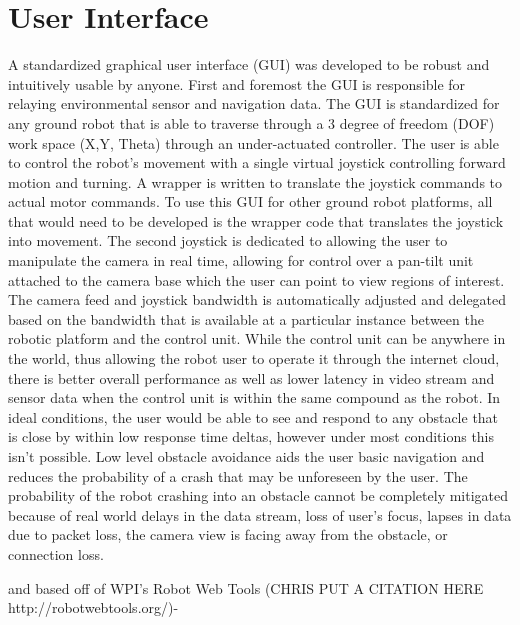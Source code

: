 \section{User Interface}\label{sec:ui}

A standardized graphical user interface (GUI) was developed to be robust and intuitively usable by anyone. First and foremost the GUI is responsible for relaying environmental sensor and navigation data. The GUI is standardized for any ground robot that is able to traverse through a 3 degree of freedom (DOF) work space (X,Y, Theta) through an under-actuated controller. The user is able to control the robot's movement with a single virtual joystick controlling forward motion and turning. A wrapper is written to translate the joystick commands to actual motor commands. To use this GUI for other ground robot platforms, all that would need to be developed is the wrapper code that translates the joystick into movement. The second joystick is dedicated to allowing the user to manipulate the camera in real time, allowing for control over a pan-tilt unit attached to the camera base which the user can point to view regions of interest. The camera feed and joystick bandwidth is automatically adjusted and delegated based on the bandwidth that is available at a particular instance between the robotic platform and the control unit. While the control unit can be anywhere in the world, thus allowing the robot user to operate it through the internet cloud, there is better overall performance as well as lower latency in video stream and sensor data when the control unit is within the same compound as the robot. In ideal conditions, the user would be able to see and respond to any obstacle that is close by within low response time deltas, however under most conditions this isn't possible. Low level obstacle avoidance aids the user basic navigation and reduces the probability of a crash that may be unforeseen by the user. The probability of the robot crashing into an obstacle cannot be completely mitigated because of real world delays in the data stream, loss of user's focus, lapses in data due to packet loss, the camera view is facing away from the obstacle, or connection loss.

and based off of WPI's Robot Web Tools (CHRIS PUT A CITATION HERE http://robotwebtools.org/)-  

